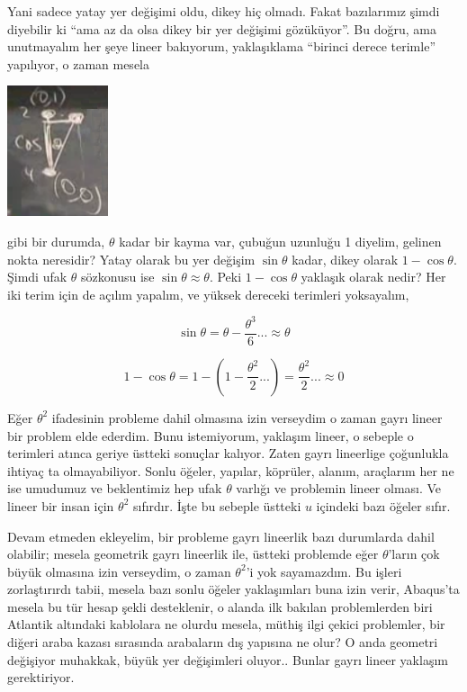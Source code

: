 \documentclass[12pt,fleqn]{article}\usepackage{../../common}
\begin{document}
Yani sadece yatay yer değişimi oldu, dikey hiç olmadı. Fakat bazılarımız şimdi
diyebilir ki ``ama az da olsa dikey bir yer değişimi gözüküyor''. Bu doğru, ama
unutmayalım her şeye lineer bakıyorum, yaklaşıklama ``birinci derece terimle''
yapılıyor, o zaman mesela

\includegraphics[width=8em]{compscieng_1_15_04.png}

gibi bir durumda, $\theta$ kadar bir kayma var, çubuğun uzunluğu 1 diyelim,
gelinen nokta neresidir? Yatay olarak bu yer değişim $\sin\theta$ kadar, dikey
olarak $1-\cos\theta$. Şimdi ufak $\theta$ sözkonusu ise $\sin\theta \approx
\theta$. Peki $1-\cos\theta$ yaklaşık olarak nedir?  Her iki terim için de
açılım yapalım, ve yüksek dereceki terimleri yoksayalım,

$$
\sin\theta = \theta - \frac{\theta^3}{6} ... \approx \theta
$$

$$
1-\cos\theta = 1 - (1-\frac{\theta^2}{2} ... ) = \frac{\theta^2}{2} ... \approx 0
$$

Eğer $\theta^2$ ifadesinin probleme dahil olmasına izin verseydim o zaman gayrı
lineer bir problem elde ederdim. Bunu istemiyorum, yaklaşım lineer, o sebeple o
terimleri atınca geriye üstteki sonuçlar kalıyor. Zaten gayrı lineerlige
çoğunlukla ihtiyaç ta olmayabiliyor. Sonlu öğeler, yapılar, köprüler, alanım,
araçlarım her ne ise umudumuz ve beklentimiz hep ufak $\theta$ varlığı ve
problemin lineer olması. Ve lineer bir insan için $\theta^2$ sıfırdır. İşte
bu sebeple üstteki $u$ içindeki bazı öğeler sıfır.

Devam etmeden ekleyelim, bir probleme gayrı lineerlik bazı durumlarda dahil
olabilir; mesela geometrik gayrı lineerlik ile, üstteki problemde eğer
$\theta$'ların çok büyük olmasına izin verseydim, o zaman $\theta^2$'i yok
sayamazdım. Bu işleri zorlaştırırdı tabii, mesela bazı sonlu öğeler yaklaşımları
buna izin verir, Abaqus'ta mesela bu tür hesap şekli desteklenir, o alanda ilk
bakılan problemlerden biri Atlantik altındaki kablolara ne olurdu mesela, müthiş
ilgi çekici problemler, bir diğeri araba kazası sırasında arabaların dış
yapısına ne olur? O anda geometri değişiyor muhakkak, büyük yer değişimleri
oluyor.. Bunlar gayrı lineer yaklaşım gerektiriyor.
\end{document}
